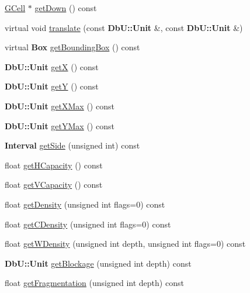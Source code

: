 \begin{DoxyCompactItemize}
\item 
\mbox{\hyperlink{classKatabatic_1_1GCell}{G\+Cell}} $\ast$ \mbox{\hyperlink{classKatabatic_1_1GCell_ae448c9d6d028e967d7bd5a1bfdd05311}{get\+Down}} () const
\item 
virtual void \mbox{\hyperlink{classKatabatic_1_1GCell_a819f3ffbba69e4de2a19c827676b5aee}{translate}} (const \textbf{ Db\+U\+::\+Unit} \&, const \textbf{ Db\+U\+::\+Unit} \&)
\item 
virtual \textbf{ Box} \mbox{\hyperlink{classKatabatic_1_1GCell_ab5d8bf98ab5af6fcfebea1b9f446d5d7}{get\+Bounding\+Box}} () const
\item 
\textbf{ Db\+U\+::\+Unit} \mbox{\hyperlink{classKatabatic_1_1GCell_a00b8f54c8171f6699e57de1b8c18eeb1}{getX}} () const
\item 
\textbf{ Db\+U\+::\+Unit} \mbox{\hyperlink{classKatabatic_1_1GCell_a4580de6b074712e400d5d238ce3af054}{getY}} () const
\item 
\textbf{ Db\+U\+::\+Unit} \mbox{\hyperlink{classKatabatic_1_1GCell_aaf7ff16cd2fd5a3fa4c5221efb9b9b76}{get\+X\+Max}} () const
\item 
\textbf{ Db\+U\+::\+Unit} \mbox{\hyperlink{classKatabatic_1_1GCell_a096a92c18156eac4268efb50496a2d18}{get\+Y\+Max}} () const
\item 
\textbf{ Interval} \mbox{\hyperlink{classKatabatic_1_1GCell_a10f3dd5001b2015e34a9aacdacf6eae6}{get\+Side}} (unsigned int) const
\item 
float \mbox{\hyperlink{classKatabatic_1_1GCell_ad0dda8d59162b90040263fc55d7da714}{get\+H\+Capacity}} () const
\item 
float \mbox{\hyperlink{classKatabatic_1_1GCell_a3994e204ebccf8aa12899e0c5ef4112b}{get\+V\+Capacity}} () const
\item 
float \mbox{\hyperlink{classKatabatic_1_1GCell_ad31c16c87377e164728a0df55e21f96b}{get\+Density}} (unsigned int flags=0) const
\item 
float \mbox{\hyperlink{classKatabatic_1_1GCell_ae56b981fad5960835faef809ec282cfa}{get\+C\+Density}} (unsigned int flags=0) const
\item 
float \mbox{\hyperlink{classKatabatic_1_1GCell_aa64538731e911c60eeaea557be1c7740}{get\+W\+Density}} (unsigned int depth, unsigned int flags=0) const
\item 
\textbf{ Db\+U\+::\+Unit} \mbox{\hyperlink{classKatabatic_1_1GCell_ab37ffda5a2e1ba60931d32c29237bd33}{get\+Blockage}} (unsigned int depth) const
\item 
float \mbox{\hyperlink{classKatabatic_1_1GCell_a44ec8d16030b5900bd0ccc02652b727f}{get\+Fragmentation}} (unsigned int depth) const

\end{DoxyCompactItemize}
